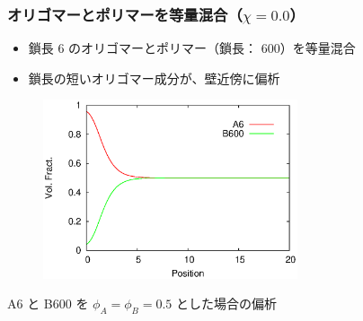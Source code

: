 \documentclass[unicode,12pt]{beamer}%
\begin{document}
\begin{frame}\frametitle {オリゴマーとポリマーを等量混合（$\chi = 0.0$）}

\begin{itemize}
	\item 鎖長 6 のオリゴマーとポリマー（鎖長： 600）を等量混合
	\item 鎖長の短いオリゴマー成分が、壁近傍に偏析
\end{itemize}

\vspace{-0.5\baselineskip}
\begin{figure}[htbp]
	\begin{center}
		\includegraphics[width=75mm]{Sym_A6B600_Chi_0.eps}
	\end{center}
\end{figure}

\begin{center}
\vspace{-0.5\baselineskip}
{\small A6 と B600 を $\phi_A = \phi_B = 0.5$ とした場合の偏析}
\end{center}

\end{frame}
\end{document}
